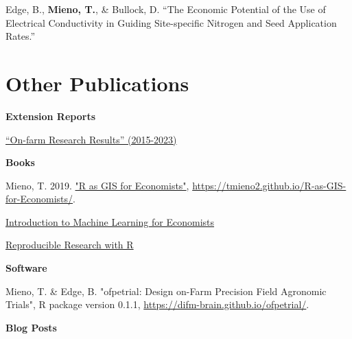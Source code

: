 \documentclass[10pt,margin,line]{res}
\newenvironment{list1}{
  \begin{list}{\ding{113}}{%
      \setlength{\itemsep}{0in}
      \setlength{\parsep}{0in} \setlength{\parskip}{0in}
      \setlength{\topsep}{0in} \setlength{\partopsep}{0in}
      \setlength{\leftmargin}{0.17in}}}{\end{list}}
\newenvironment{list2}{
  \begin{list}{-}{%
      \setlength{\itemsep}{0in}
      \setlength{\parsep}{0in} \setlength{\parskip}{0in}
      \setlength{\topsep}{0in} \setlength{\partopsep}{0in}
      \setlength{\leftmargin}{0.2in}}}{\end{list}}
\begin{document}
\begin{resume}
\begin{list1}
\item[] Edge, B., \textbf{Mieno, T.}, \& Bullock, D. ``The Economic Potential of the Use of Electrical Conductivity in Guiding Site-specific Nitrogen and Seed Application Rates.'' 
\vspace*{0.3cm}

\end{list1}


\section{\sc Other Publications}

\begin{list1}
\item[] \textbf{Extension Reports}
  \begin{list2}
    \item \href{https://cropwatch.unl.edu/farmresearch/farm-research-result-publications}{``On-farm Research Results'' (2015-2023)}
  \end{list2}
\vspace*{0.3cm}
\item[] \textbf{Books}
  \begin{list2}
    \item Mieno, T. 2019. \href{https://tmieno2.github.io/R-as-GIS-for-Economists/}{"R as GIS for Economists"}, \url{https://tmieno2.github.io/R-as-GIS-for-Economists/}.
    \item \href{https://tmieno2.github.io/ML-Economist/}{Introduction to Machine Learning for Economists}
    \item \href{https://tmieno2.github.io/WritingJournalArticleRmarkdown/}{Reproducible Research with R}
  \end{list2}
\vspace*{0.3cm}
\item[] \textbf{Software}
  \begin{list2}
    \item Mieno, T. \& Edge, B. "ofpetrial: Design on-Farm Precision Field Agronomic Trials", R package version 0.1.1, \url{https://difm-brain.github.io/ofpetrial/}.
  \end{list2}
\vspace*{0.3cm}
\item[] \textbf{Blog Posts}
  \begin{list2}

\end{list2}
\end{list1}
\end{resume}
\end{document}
